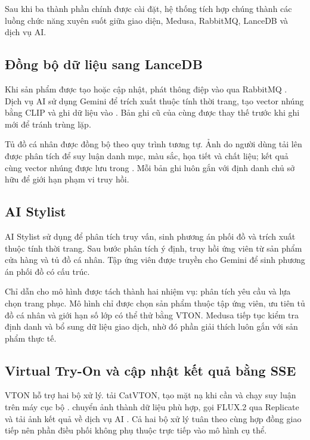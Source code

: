 Sau khi ba thành phần chính được cài đặt, hệ thống tích hợp chúng thành các luồng chức năng xuyên suốt giữa giao diện, Medusa, RabbitMQ, LanceDB và dịch vụ AI.

\medskip

\subsection{Đồng bộ dữ liệu sang LanceDB}

Khi sản phẩm được tạo hoặc cập nhật,  phát thông điệp vào  qua RabbitMQ \cite{rabbitmq}. Dịch vụ AI sử dụng Gemini để trích xuất thuộc tính thời trang, tạo vector nhúng bằng CLIP và ghi dữ liệu vào . Bản ghi cũ của cùng  được thay thế trước khi ghi mới để tránh trùng lặp.

\medskip

Tủ đồ cá nhân được đồng bộ theo quy trình tương tự. Ảnh do người dùng tải lên được phân tích để suy luận danh mục, màu sắc, họa tiết và chất liệu; kết quả cùng vector nhúng được lưu trong . Mỗi bản ghi luôn gắn với định danh chủ sở hữu để giới hạn phạm vi truy hồi.

\subsection{AI Stylist}

AI Stylist sử dụng  để phân tích truy vấn, sinh phương án phối đồ và trích xuất thuộc tính thời trang. Sau bước phân tích ý định,  truy hồi ứng viên từ sản phẩm cửa hàng và tủ đồ cá nhân. Tập ứng viên được truyền cho Gemini để sinh phương án phối đồ có cấu trúc.

\medskip

Chỉ dẫn cho mô hình được tách thành hai nhiệm vụ: phân tích yêu cầu và lựa chọn trang phục. Mô hình chỉ được chọn sản phẩm thuộc tập ứng viên, ưu tiên tủ đồ cá nhân và giới hạn số lớp có thể thử bằng VTON. Medusa tiếp tục kiểm tra định danh và bổ sung dữ liệu giao dịch, nhờ đó phần giải thích luôn gắn với sản phẩm thực tế.

\subsection{Virtual Try-On và cập nhật kết quả bằng SSE}

VTON hỗ trợ hai bộ xử lý.  tải CatVTON, tạo mặt nạ khi cần và chạy suy luận trên máy cục bộ \cite{catvton}.  chuyển ảnh thành dữ liệu phù hợp, gọi FLUX.2 qua Replicate và tải ảnh kết quả về dịch vụ AI \cite{replicate}. Cả hai bộ xử lý tuân theo cùng hợp đồng giao tiếp nên phần điều phối không phụ thuộc trực tiếp vào mô hình cụ thể.

